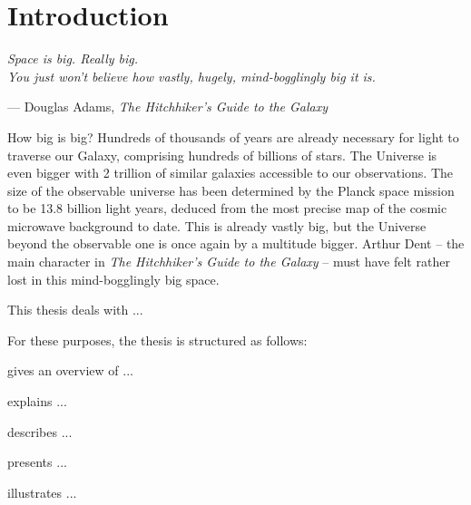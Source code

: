 \chapter{Introduction}

\begin{flushright}
	\textit{Space is big. Really big.\\You just won't believe how vastly, hugely, mind-bogglingly big it is.}

	\vspace{0.3cm}
	--- Douglas Adams, \textit{The Hitchhiker's Guide to the Galaxy}
	\vspace{0.3cm}
\end{flushright}

How big is big? 
Hundreds of thousands of years are already necessary for light to traverse our Galaxy, comprising hundreds of billions of stars.
The Universe is even bigger with 2 trillion of similar galaxies accessible to our observations.
The size of the observable universe has been determined by the Planck space mission to be 13.8 billion light years, deduced from the most precise map of the cosmic microwave background to date.
This is already vastly big, but the Universe beyond the observable one is once again by a multitude bigger.
Arthur Dent -- the main character in \textit{The Hitchhiker's Guide to the Galaxy} -- must have felt rather lost in this mind-bogglingly big space.

\vspace{0.2cm}

\blindtext[3]

\clearpage

\blindtext[1]

\vspace{0.2cm}

This thesis deals with ...
 
\vspace{0.2cm}

For these purposes, the thesis is structured as follows:

\begin{description}[leftmargin=0cm]
\item[\textcolor{uofablue}{Chapter 2}] gives an overview of ...
\item[\textcolor{uofablue}{Chapter 3}] explains ...
\item[\textcolor{uofablue}{Chapter 4}] describes ...
\item[\textcolor{uofablue}{Chapter 5}] presents ...
\item[\textcolor{uofablue}{Chapter 6}] illustrates ...
\end{description}
